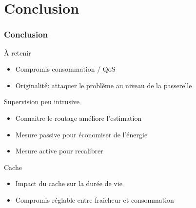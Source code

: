 \section{Conclusion}

\begin{frame}\frametitle{Conclusion}

  \begin{block}{À retenir}
    \begin{itemize}
      \item Compromis consommation / QoS
      \item Originalité: attaquer le problème au niveau de la passerelle
        \end{itemize}    
  \end{block}
  

  \begin{block}{Supervision peu intrusive}
      \begin{itemize}
        \item Connaitre le routage améliore l'estimation
        \item Mesure passive pour économiser de l'énergie
        \item Mesure active pour recalibrer
      \end{itemize}
  \end{block}

  \begin{block}{Cache}

    \begin{itemize}

      \item Impact du cache sur la durée de vie
      \item Compromis réglable entre fraicheur et consommation

    \end{itemize}

  \end{block}


\end{frame}

